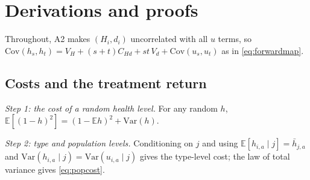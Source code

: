 \documentclass[11pt]{article}
\theoremstyle{remark}
\newcommand{\flag}[1]{\textcolor{red!70!black}{[\textbf{Flag:} \textit{#1}]}}
\newcommand{\E}{\mathbb{E}}
\newcommand{\Var}{\mathrm{Var}}
\newcommand{\Cov}{\mathrm{Cov}}
\begin{document}

\newpage

\appendix

\section{Derivations and proofs}\label{app:derivations}

Throughout, A2 makes $(H_i,d_i)$ uncorrelated with all $u$ terms, so $\Cov(h_s,h_t)=V_H+(s+t)C_{Hd}+st\,V_d+\Cov(u_s,u_t)$ as in \eqref{eq:forwardmap}.

\subsection*{Costs and the treatment return}\label{app:cost}

\emph{Step 1: the cost of a random health level.} For any random $h$, $\E[(1-h)^2]=(1-\E h)^2+\Var(h)$.

\emph{Step 2: type and population levels.} Conditioning on $j$ and using $\E[h_{i,a}\mid j]=\bar h_{j,a}$ and $\Var(h_{i,a}\mid j)=\Var(u_{i,a}\mid j)$ gives the type-level cost; the law of total variance gives \eqref{eq:popcost}.
\end{document}
